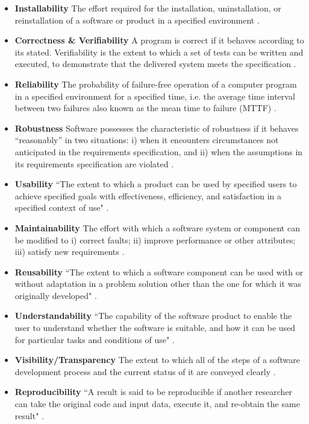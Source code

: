 \begin{itemize}
	\item \textbf{Installability} The effort required for the installation, uninstallation, or reinstallation of a software or product in a specified environment \cite{ISO/IEC25010} \cite{lenhard2013measuring}.

	\item \textbf{Correctness \& Verifiability} A program is correct if it behaves according to its stated. Verifiability is the extent to which a set of tests can be written and executed, to demonstrate that the delivered system meets the specification \cite{GhezziEtAl2003}.

	\item \textbf{Reliability} The probability of failure-free operation of a computer program in a specified environment for a specified time, i.e. the average time interval between two failures also known as the mean time to failure (MTTF) \cite{musa1987software} 
	\cite{GhezziEtAl2003}.

	\item \textbf{Robustness} Software possesses the characteristic of robustness if it behaves ``reasonably'' in two situations: i) when it encounters circumstances not anticipated in the requirements specification, and ii) when the assumptions in its requirements specification are violated \cite{ghezzi1991fundamentals} \cite{boehm2007software}.

	\item \textbf{Usability} ``The extent to which a product can be used by specified users to achieve specified goals with effectiveness, efficiency, and satisfaction in a specified context of use" \cite{ISO/TR16982:2002} \cite{ISO9241-11:2018}.

	\item \textbf{Maintainability} The effort with which a software system or component can be modified to i) correct faults; ii) improve performance or other attributes; iii) satisfy new requirements \cite{IEEEStdGlossarySET1990} \cite{boehm2007software}.

	\item \textbf{Reusability} ``The extent to which a software component can be used with or without adaptation in a problem solution other than the one for which it was originally developed" \cite{kalagiakos2003non}.

	\item \textbf{Understandability} ``The capability of the software product to enable the user to understand whether the software is suitable, and how it can be used for particular tasks and conditions of use" \cite{iso2001iec}.

	\item \textbf{Visibility/Transparency} The extent to which all of the steps of a software development process and the current status of it are conveyed clearly \cite{ghezzi1991fundamentals}.

	\item \textbf{Reproducibility} ``A result is said to be reproducible if another researcher can take the original code and input data, execute it, and re-obtain the same result" \cite{BenureauAndRougier2017}.
\end{itemize}

